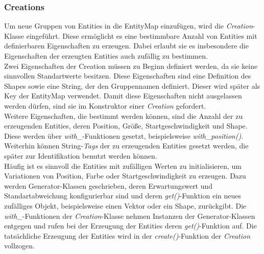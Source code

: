 \documentclass[11pt,a4paper]{article}
\begin{document}
\subsubsection{Creations}
Um neue Gruppen von Entities in die EntityMap einzufügen, wird die \textit{Creation}-Klasse eingeführt. Diese ermöglicht es eine bestimmbare Anzahl von Entities mit definierbaren Eigenschaften zu erzeugen. Dabei erlaubt sie es insbesondere die Eigenschaften der erzeugten Entities auch zufällig zu bestimmen.\\
Zwei Eigenschaften der Creation müssen zu Beginn definiert werden, da sie keine sinnvollen Standartwerte besitzen. Diese Eigenschaften sind eine Definition des Shapes sowie eine String, der den Gruppennamen definiert. Dieser wird später als Key der EntityMap verwendet. Damit diese Eigenschaften nicht ausgelassen werden dürfen, sind sie im Konstruktor einer \textit{Creation} gefordert.\\
Weitere Eigenschaften, die bestimmt werden können, sind die Anzahl der zu erzeugenden Entities, deren Position, Größe, Startgeschwindigkeit und Shape. Diese werden über \textit{with\_}-Funktionen gesetzt, beispielsweise \textit{with\_position()}. Weiterhin können String-\textit{Tags} der zu erzeugenden Entities gesetzt werden, die später zur Identifikation benutzt werden können.\\
Häufig ist es sinnvoll die Entities mit zufälligen Werten zu initialisieren, um Variationen von Position, Farbe oder Startgeschwindigkeit zu erzeugen. Dazu werden Generator-Klassen geschrieben, deren Erwartungswert und Standartabweichung konfigurierbar sind und deren \textit{get()}-Funktion ein neues zufälliges Objekt, beispielsweise einen Vektor oder ein Shape, zurückgibt. Die \textit{with\_}-Funktionen der \textit{Creation}-Klasse nehmen Instanzen der Generator-Klassen entgegen und rufen bei der Erzeugung der Entities deren \textit{get()}-Funktion auf. Die tatsächliche Erzeugung der Entities wird in der \textit{create()}-Funktion der \textit{Creation} vollzogen.

\newpage
\end{document}
